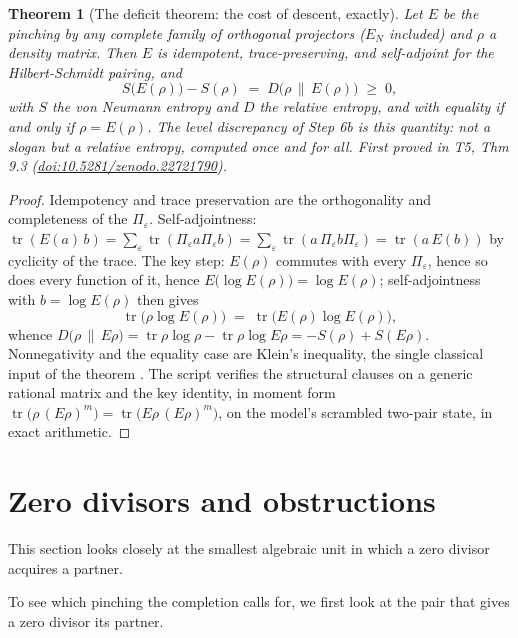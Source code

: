 \documentclass[11pt]{article}
\newtheorem{theorem}{Theorem}[section]
\theoremstyle{definition}
\theoremstyle{plain}
\providecommand{\EN}{}\renewcommand{\EN}{E_{N}}
\providecommand{\tr}{}\renewcommand{\tr}{\operatorname{tr}}
\providecommand{\rel}{}\renewcommand{\rel}[2]{D\bigl(#1 \,\|\, #2\bigr)}
\begin{document}
\begin{theorem}[The deficit theorem: the cost of descent, exactly]\label{c:singularity.deficit-theorem-cost-descent-exactly}
Let $E$ be the pinching by any complete family of orthogonal projectors ($\EN$ included) and $\rho$ a density matrix. Then $E$ is idempotent, trace-preserving, and self-adjoint for the Hilbert-Schmidt pairing, and
\[
S\bigl(E(\rho)\bigr) - S(\rho) \;=\; \rel{\rho}{E(\rho)} \;\geq\; 0 ,
\]
with $S$ the von Neumann entropy and $D$ the relative entropy, and with equality if and only if $\rho = E(\rho)$. The level discrepancy of Step 6b is this quantity: not a slogan but a relative entropy, computed once and for all.
\emph{First proved in} T5, Thm 9.3 (\href{https://doi.org/10.5281/zenodo.22721790}{doi:10.5281/zenodo.22721790}).
\end{theorem}
\begin{proof}
Idempotency and trace preservation are the orthogonality and completeness of the $\Pi_\varepsilon$. Self-adjointness: $\tr(E(a)\,b) = \sum_\varepsilon \tr(\Pi_\varepsilon a \Pi_\varepsilon b) = \sum_\varepsilon \tr(a\, \Pi_\varepsilon b \Pi_\varepsilon) = \tr(a\,E(b))$ by cyclicity of the trace. The key step: $E(\rho)$ commutes with every $\Pi_\varepsilon$, hence so does every function of it, hence $E\bigl(\log E(\rho)\bigr) = \log E(\rho)$; self-adjointness with $b = \log E(\rho)$ then gives
\[
\tr\bigl(\rho \log E(\rho)\bigr) \;=\; \tr\bigl(E(\rho) \log E(\rho)\bigr) ,
\]
whence $\rel{\rho}{E\rho} = \tr\rho\log\rho - \tr\rho\log E\rho = -S(\rho) + S(E\rho)$. Nonnegativity and the equality case are Klein's inequality, the single classical input of the theorem \cite[\S 11.3]{NielsenChuang}. The script verifies the structural clauses on a generic rational matrix and the key identity, in moment form $\tr\bigl(\rho\,(E\rho)^m\bigr) = \tr\bigl(E\rho\,(E\rho)^m\bigr)$, on the model's scrambled two-pair state, in exact arithmetic.

\end{proof}

\section{Zero divisors and obstructions}

This section looks closely at the smallest algebraic unit in which a zero divisor acquires a partner.

To see which pinching the completion calls for, we first look at the pair that gives a zero divisor its partner.
\end{document}
